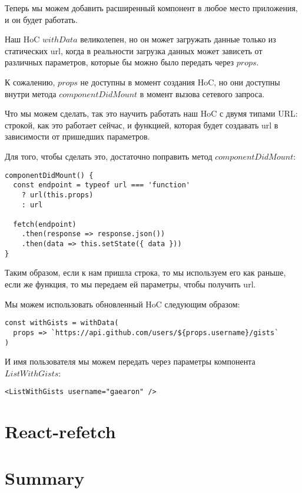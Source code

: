 Теперь мы можем добавить расширенный компонент в любое место приложения, и он будет работать.

Наш HoC $withData$ великолепен, но он может загружать данные только из статических url, когда в реальности загрузка данных может зависеть от различных параметров, которые бы можно было передать через $props$.

К сожалению, $props$ не доступны в момент создания HoC, но они доступны внутри метода $componentDidMount$ в момент вызова сетевого запроса.

Что мы можем сделать, так это научить работать наш HoC с двумя типами URL: строкой, как это работает сейчас, и функцией, которая будет создавать url в зависимости от пришедших параметров.

Для того, чтобы сделать это, достаточно поправить метод $componentDidMount$:

\begin{lstlisting}
componentDidMount() {
  const endpoint = typeof url === 'function'
    ? url(this.props)
    : url
    
  fetch(endpoint)
    .then(response => response.json())
    .then(data => this.setState({ data }))
}
\end{lstlisting}

Таким образом, если к нам пришла строка, то мы используем его как раньше, если же функция, то мы передаем ей параметры, чтобы получить url.

Мы можем использовать обновленный HoC следующим образом:
\begin{lstlisting}
const withGists = withData(
  props => `https://api.github.com/users/${props.username}/gists`
)
\end{lstlisting}

И имя пользователя мы можем передать через параметры компонента $ListWithGists$:

\begin{lstlisting}
<ListWithGists username="gaearon" />
\end{lstlisting}


\section{React-refetch}



\section{Summary}









